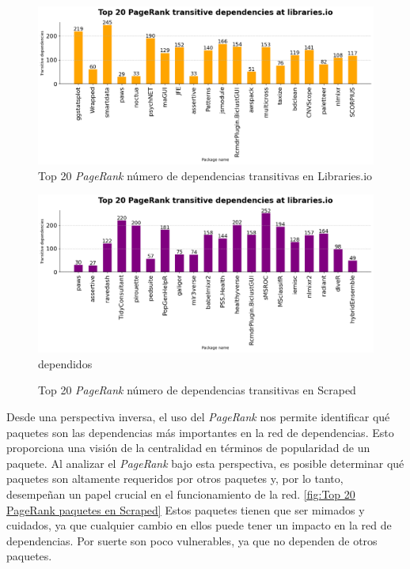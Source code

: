 \begin{figure}[ht!]
    \begin{center}
        \includegraphics[width=1\textwidth]{img/cran/pr_trans.png}
        \caption{Top 20 \textit{PageRank} número de dependencias transitivas en Libraries.io}
        \label{fig:Top 20 PageRank número de dependencias transitivas en Libraries.io}
    \end{center}
\end{figure}

\begin{figure}[ht!]
    \begin{center}
        \includegraphics[width=1\textwidth]{img/cran/pr_trans2.png}dependidos
        \caption{Top 20 \textit{PageRank} número de dependencias transitivas en Scraped}
        \label{fig:Top 20 PageRank número de dependencias transitivas en Scraped}
    \end{center}
\end{figure}

Desde una perspectiva inversa, el uso del \textit{PageRank} nos permite identificar qué paquetes son las dependencias
más importantes en la red de dependencias. Esto proporciona una visión de
la centralidad en términos de popularidad de un paquete. Al analizar el \textit{PageRank} bajo esta perspectiva, es
posible determinar qué paquetes son altamente requeridos por otros paquetes y, por lo tanto,
desempeñan un papel crucial en el funcionamiento de la red. \ref{fig:Top 20 PageRank paquetes en Scraped}
Estos paquetes tienen que ser mimados y cuidados, ya que cualquier cambio en ellos puede tener un impacto
en la red de dependencias. Por suerte son poco vulnerables, ya que no dependen de otros paquetes.

